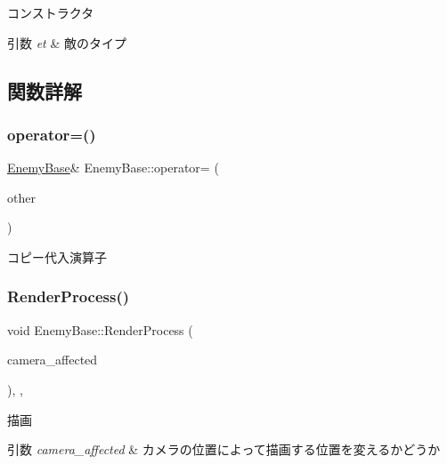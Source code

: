 コンストラクタ 


\begin{DoxyParams}{引数}
{\em et} & 敵のタイプ \\
\hline
\end{DoxyParams}


\subsection{関数詳解}
\mbox{\label{class_enemy_base_ab733c603aedea1306fe42755c784a9db}} 
\subsubsection{\texorpdfstring{operator=()}{operator=()}}
{\footnotesize\ttfamily \mbox{\hyperlink{class_enemy_base}{Enemy\+Base}}\& Enemy\+Base\+::operator= (\begin{DoxyParamCaption}\item[{const \mbox{\hyperlink{class_enemy_base}{Enemy\+Base}} \&}]{other }\end{DoxyParamCaption})\hspace{0.3cm}{\ttfamily [inline]}}



コピー代入演算子 

\mbox{\label{class_enemy_base_af874ce6fc410fddc7d55ffd7c7bedac8}} 
\subsubsection{\texorpdfstring{Render\+Process()}{RenderProcess()}}
{\footnotesize\ttfamily void Enemy\+Base\+::\+Render\+Process (\begin{DoxyParamCaption}\item[{bool}]{camera\+\_\+affected }\end{DoxyParamCaption})\hspace{0.3cm}{\ttfamily [final]}, {\ttfamily [protected]}, {\ttfamily [virtual]}}



描画 


\begin{DoxyParams}{引数}
{\em camera\+\_\+affected} & カメラの位置によって描画する位置を変えるかどうか \\
\hline
\end{DoxyParams}


